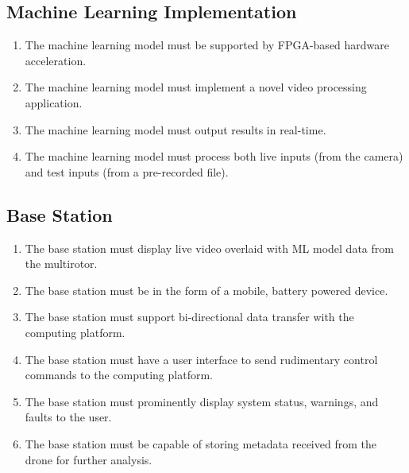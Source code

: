 \documentclass[10pt,letterpaper]{article}
\begin{document}
\subsection{Machine Learning Implementation}
\begin{enumerate}[label=F.ML.\arabic*, wide=1cm, widest=3cm, leftmargin=*, font=\bfseries, noitemsep,topsep=0pt, parsep=4pt, partopsep=0pt]
	\item The machine learning model must be supported by FPGA-based hardware acceleration.
	\item The machine learning model must implement a novel video processing application.
	\item The machine learning model must output results in real-time.
	\item The machine learning model must process both live inputs (from the camera) and test inputs (from a pre-recorded file). 
\end{enumerate}

\subsection{Base Station}
\begin{enumerate}[label=F.BS.\arabic*, wide=1cm, widest=3cm, leftmargin=*, font=\bfseries, noitemsep,topsep=0pt, parsep=4pt, partopsep=0pt]
    \item The base station must display live video overlaid with ML model data from the multirotor.
    \item The base station must be in the form of a mobile, battery powered device.
	\item The base station must support bi-directional data transfer with the computing platform.
	\item The base station must have a user interface to send rudimentary control commands to the computing platform.
	\item The base station must prominently display system status, warnings, and faults to the user.
    \item The base station must be capable of storing metadata received from the drone for further analysis.
\end{enumerate}
\end{document}
